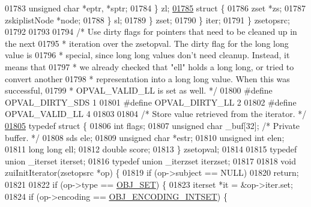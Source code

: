 \begin{DoxyCode}
01783                 \textcolor{keywordtype}{unsigned} \textcolor{keywordtype}{char} *eptr, *sptr;
01784             \} zl;
\hyperlink{structzsetopsrc_1_1__iterzset_8iter_8zset_8sl}{01785}             \textcolor{keyword}{struct} \{
01786                 zset *zs;
01787                 zskiplistNode *node;
01788             \} sl;
01789         \} zset;
01790     \} iter;
01791 \} zsetopsrc;
01792 
01793 
01794 \textcolor{comment}{/* Use dirty flags for pointers that need to be cleaned up in the next}
01795 \textcolor{comment}{ * iteration over the zsetopval. The dirty flag for the long long value is}
01796 \textcolor{comment}{ * special, since long long values don't need cleanup. Instead, it means that}
01797 \textcolor{comment}{ * we already checked that "ell" holds a long long, or tried to convert another}
01798 \textcolor{comment}{ * representation into a long long value. When this was successful,}
01799 \textcolor{comment}{ * OPVAL\_VALID\_LL is set as well. */}
01800 \textcolor{preprocessor}{#}\textcolor{preprocessor}{define} \textcolor{preprocessor}{OPVAL\_DIRTY\_SDS} 1
01801 \textcolor{preprocessor}{#}\textcolor{preprocessor}{define} \textcolor{preprocessor}{OPVAL\_DIRTY\_LL} 2
01802 \textcolor{preprocessor}{#}\textcolor{preprocessor}{define} \textcolor{preprocessor}{OPVAL\_VALID\_LL} 4
01803 
01804 \textcolor{comment}{/* Store value retrieved from the iterator. */}
\hyperlink{structzsetopval}{01805} \textcolor{keyword}{typedef} \textcolor{keyword}{struct} \{
01806     \textcolor{keywordtype}{int} flags;
01807     \textcolor{keywordtype}{unsigned} \textcolor{keywordtype}{char} \_buf[32]; \textcolor{comment}{/* Private buffer. */}
01808     sds ele;
01809     \textcolor{keywordtype}{unsigned} \textcolor{keywordtype}{char} *estr;
01810     \textcolor{keywordtype}{unsigned} \textcolor{keywordtype}{int} elen;
01811     \textcolor{keywordtype}{long} \textcolor{keywordtype}{long} ell;
01812     \textcolor{keywordtype}{double} score;
01813 \} zsetopval;
01814 
01815 \textcolor{keyword}{typedef} \textcolor{keyword}{union} \_iterset iterset;
01816 \textcolor{keyword}{typedef} \textcolor{keyword}{union} \_iterzset iterzset;
01817 
01818 \textcolor{keywordtype}{void} zuiInitIterator(zsetopsrc *op) \{
01819     \textcolor{keywordflow}{if} (op->subject == NULL)
01820         \textcolor{keywordflow}{return};
01821 
01822     \textcolor{keywordflow}{if} (op->type == \hyperlink{server_8h_a8d179375a4aac33d3fa7aa80c8ccc75f}{OBJ\_SET}) \{
01823         iterset *it = &op->iter.set;
01824         \textcolor{keywordflow}{if} (op->encoding == \hyperlink{server_8h_a214173987de21c3b7661fddd42b05873}{OBJ\_ENCODING\_INTSET}) \{

\end{DoxyCode}
